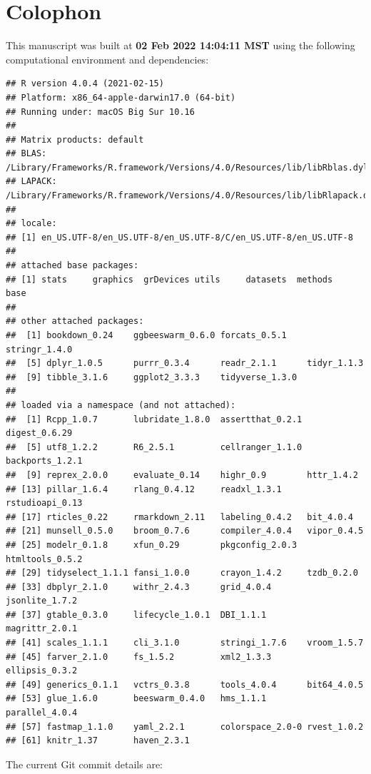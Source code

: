 \documentclass[smallextended]{svjour3}       %
\begin{document}
\hypertarget{colophon}{%
\section{Colophon}\label{colophon}}

This manuscript was built at \textbf{02 Feb 2022 14:04:11 MST} using the following computational environment and dependencies:

\begin{verbatim}
## R version 4.0.4 (2021-02-15)
## Platform: x86_64-apple-darwin17.0 (64-bit)
## Running under: macOS Big Sur 10.16
## 
## Matrix products: default
## BLAS:   /Library/Frameworks/R.framework/Versions/4.0/Resources/lib/libRblas.dylib
## LAPACK: /Library/Frameworks/R.framework/Versions/4.0/Resources/lib/libRlapack.dylib
## 
## locale:
## [1] en_US.UTF-8/en_US.UTF-8/en_US.UTF-8/C/en_US.UTF-8/en_US.UTF-8
## 
## attached base packages:
## [1] stats     graphics  grDevices utils     datasets  methods   base     
## 
## other attached packages:
##  [1] bookdown_0.24    ggbeeswarm_0.6.0 forcats_0.5.1    stringr_1.4.0   
##  [5] dplyr_1.0.5      purrr_0.3.4      readr_2.1.1      tidyr_1.1.3     
##  [9] tibble_3.1.6     ggplot2_3.3.3    tidyverse_1.3.0 
## 
## loaded via a namespace (and not attached):
##  [1] Rcpp_1.0.7       lubridate_1.8.0  assertthat_0.2.1 digest_0.6.29   
##  [5] utf8_1.2.2       R6_2.5.1         cellranger_1.1.0 backports_1.2.1 
##  [9] reprex_2.0.0     evaluate_0.14    highr_0.9        httr_1.4.2      
## [13] pillar_1.6.4     rlang_0.4.12     readxl_1.3.1     rstudioapi_0.13 
## [17] rticles_0.22     rmarkdown_2.11   labeling_0.4.2   bit_4.0.4       
## [21] munsell_0.5.0    broom_0.7.6      compiler_4.0.4   vipor_0.4.5     
## [25] modelr_0.1.8     xfun_0.29        pkgconfig_2.0.3  htmltools_0.5.2 
## [29] tidyselect_1.1.1 fansi_1.0.0      crayon_1.4.2     tzdb_0.2.0      
## [33] dbplyr_2.1.0     withr_2.4.3      grid_4.0.4       jsonlite_1.7.2  
## [37] gtable_0.3.0     lifecycle_1.0.1  DBI_1.1.1        magrittr_2.0.1  
## [41] scales_1.1.1     cli_3.1.0        stringi_1.7.6    vroom_1.5.7     
## [45] farver_2.1.0     fs_1.5.2         xml2_1.3.3       ellipsis_0.3.2  
## [49] generics_0.1.1   vctrs_0.3.8      tools_4.0.4      bit64_4.0.5     
## [53] glue_1.6.0       beeswarm_0.4.0   hms_1.1.1        parallel_4.0.4  
## [57] fastmap_1.1.0    yaml_2.2.1       colorspace_2.0-0 rvest_1.0.2     
## [61] knitr_1.37       haven_2.3.1
\end{verbatim}

The current Git commit details are:
\end{document}
